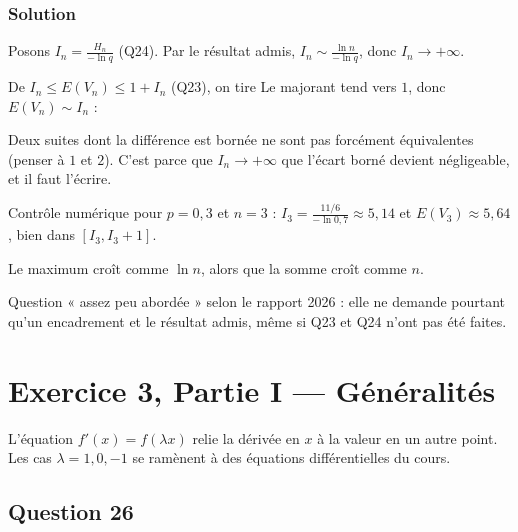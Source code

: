 \documentclass[11pt,a4paper]{article}
\newcommand{\equationajustee}[1]{%
  \sbox{\boiteequation}{$\displaystyle #1$}%
  \ifdim\wd\boiteequation>\linewidth
    \[\resizebox{\linewidth}{!}{\usebox{\boiteequation}}\]%
  \else
    \[#1\]%
  \fi}
\begin{document}
\hypertarget{solution-24}{%
\subsubsection{Solution}\label{solution-24}}

Posons \(I_n=\frac{H_n}{-\ln q}\) (Q24). Par le résultat admis, \(I_n\sim\frac{\ln n}{-\ln q}\), donc \(I_n\to+\infty\).

De \(I_n\le E(V_n)\le1+I_n\) (Q23), on tire
\equationajustee{1\le\frac{E(V_n)}{I_n}\le1+\frac1{I_n}.}
Le majorant tend vers \(1\), donc \(E(V_n)\sim I_n\) :
\equationajustee{\boxed{E(V_n)\underset{n\to+\infty}{\sim}\frac{\ln n}{\ln(1/q)}.}}

\begin{piege}

Deux suites dont la différence est bornée ne sont pas forcément équivalentes (penser à \(1\) et \(2\)). C'est parce que \(I_n\to+\infty\) que l'écart borné devient négligeable, et il faut l'écrire.

\end{piege}

\begin{methode}

Contrôle numérique pour \(p=0{,}3\) et \(n=3\) : \(I_3=\frac{11/6}{-\ln0{,}7}\approx5{,}14\) et \(E(V_3)\approx5{,}64\), bien dans \([I_3,I_3+1]\).

Le maximum croît comme \(\ln n\), alors que la somme croît comme \(n\).

\end{methode}

\begin{jury}

Question « assez peu abordée » selon le rapport 2026 : elle ne demande pourtant qu'un encadrement et le résultat admis, même si Q23 et Q24 n'ont pas été faites.

\end{jury}

\hypertarget{exercice-3-partie-i-guxe9nuxe9ralituxe9s}{%
\section{Exercice 3, Partie I --- Généralités}\label{exercice-3-partie-i-guxe9nuxe9ralituxe9s}}

L'équation \(f'(x)=f(\lambda x)\) relie la dérivée en \(x\) à la valeur en un autre point. Les cas \(\lambda=1,0,-1\) se ramènent à des équations différentielles du cours.

\hypertarget{question-26}{%
\subsection{Question 26}\label{question-26}}
\end{document}
